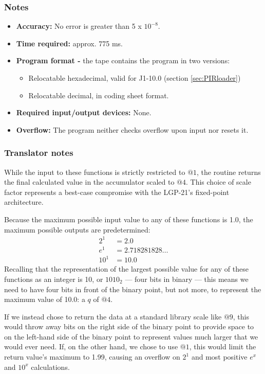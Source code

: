\documentclass{article}
\begin{document}
\subsubsection*{Notes}
\begin{itemize}
    \item \textbf{Accuracy:} No error is greater than 5 x $10^{-8}$.
    \item \textbf{Time required:} approx. 775 ms.
    \item \textbf{Program format -} the tape contains the program in two versions:
    \begin{itemize}
      \item Relocatable hexadecimal, valid for J1-10.0 (section \ref{sec:PIRloader})
        \item Relocatable decimal, in coding sheet format.
    \end{itemize}
    \item \textbf{Required input/output devices:} None.
    \item \textbf{Overflow:} The program neither checks overflow upon input nor resets it.
\end{itemize}

\subsubsection*{Translator notes}
While the input to these functions is strictly restricted to $@1$, the routine returns the final calculated value in the accumulator scaled to \emph{$@4$}. This choice of scale factor represents a best-case compromise with the LGP-21's fixed-point architecture.

Because the maximum possible input value to any of these functions is 1.0, the maximum possible outputs are predetermined:
\begin{align*}
    2^1  &= 2.0 \\
    e^1  &= 2.718281828\dots \\
    10^1 &= 10.0
\end{align*}
Recalling that the representation of the largest possible value for any of these functions as an integer is 10, or $1010_2$ --- four bits in binary --- this means we need to have four bits in front of the binary point, but not more, to represent the maximum value of 10.0: a $q$ of $@4$.

If we instead chose to return the data at a standard library scale like $@9$, this would throw away bits on the right side of the binary point to provide space to on the left-hand side of the binary point to represent values much larger that we would ever need. If, on the other hand, we chose to use $@1$, this would limit the return value's maximum to 1.99, causing an overflow on $2^1$ and most positive $e^x$ and $10^x$ calculations.
\end{document}
